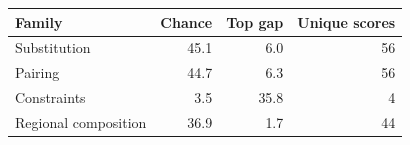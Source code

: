 \begin{tabular}{@{}l r r r@{}}
\toprule
Family & Chance & Top gap & Unique scores \\
\midrule
Substitution & 45.1 & 6.0 & 56 \\
Pairing & 44.7 & 6.3 & 56 \\
Constraints & 3.5 & 35.8 & 4 \\
Regional composition & 36.9 & 1.7 & 44 \\
\bottomrule
\end{tabular}
